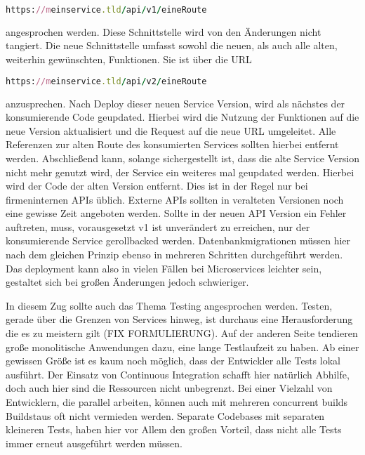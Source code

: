 \begin{lstlisting}[language=Ruby]
https://meinservice.tld/api/v1/eineRoute
\end{lstlisting}

angesprochen werden. Diese Schnittstelle wird von den Änderungen nicht tangiert. Die neue Schnittstelle umfasst sowohl die neuen, als auch alle alten, weiterhin gewünschten, Funktionen. Sie ist über die URL

\begin{lstlisting}[language=Ruby]
https://meinservice.tld/api/v2/eineRoute
\end{lstlisting}

anzusprechen. Nach Deploy dieser neuen Service Version, wird als nächstes der konsumierende Code geupdated. Hierbei wird die Nutzung der Funktionen auf die neue Version aktualisiert und die Request auf die neue URL umgeleitet. Alle Referenzen zur alten Route des konsumierten Services sollten hierbei entfernt werden. Abschließend kann, solange sichergestellt ist, dass die alte Service Version nicht mehr genutzt wird, der Service ein weiteres mal geupdated werden. Hierbei wird der Code der alten Version entfernt. Dies ist in der Regel nur bei firmeninternen APIs üblich. Externe APIs sollten in veralteten Versionen noch eine gewisse Zeit angeboten werden. Sollte in der neuen API Version ein Fehler auftreten, muss, vorausgesetzt v1 ist unverändert zu erreichen, nur der konsumierende Service gerollbacked werden. Datenbankmigrationen müssen hier nach dem gleichen Prinzip ebenso in mehreren Schritten durchgeführt werden. Das deployment kann also in vielen Fällen bei Microservices leichter sein, gestaltet sich bei großen Änderungen jedoch schwieriger.

In diesem Zug sollte auch das Thema Testing angesprochen werden. Testen, gerade über die Grenzen von Services hinweg, ist durchaus eine Herausforderung die es zu meistern gilt (FIX FORMULIERUNG). Auf der anderen Seite tendieren große monolitische Anwendungen dazu, eine lange Testlaufzeit zu haben. Ab einer gewissen Größe ist es kaum noch möglich, dass der Entwickler alle Tests lokal ausführt. Der Einsatz von Continuous Integration schafft hier natürlich Abhilfe, doch auch hier sind die Ressourcen nicht unbegrenzt. Bei einer Vielzahl von Entwicklern, die parallel arbeiten, können auch mit mehreren concurrent builds Buildstaus oft nicht vermieden werden. Separate Codebases mit separaten kleineren Tests, haben hier vor Allem den großen Vorteil, dass nicht alle Tests immer erneut ausgeführt werden müssen.


